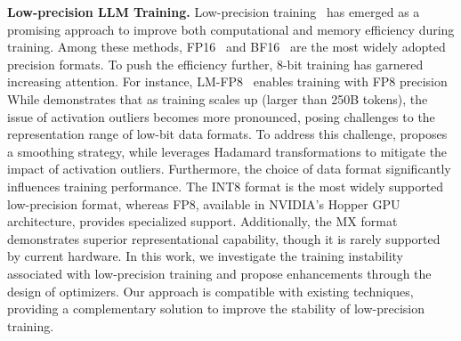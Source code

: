 \textbf{Low-precision LLM Training.} Low-precision training~\cite{wang2018training,lin2022device,xi2024coat,xi2024jetfire,wortsman2023stable} has emerged as a promising approach to improve both computational and memory efficiency during training. Among these methods, FP16~\cite{micikevicius2017mixed} and BF16~\cite{kalamkar2019study} are the most widely adopted precision formats. To push the efficiency further, 8-bit training has garnered increasing attention. For instance, LM-FP8~\cite{peng2023fp8} enables training with FP8 precision While \cite{fishman2024scaling} demonstrates that as training scales up (larger than 250B tokens), the issue of activation outliers becomes more pronounced, posing challenges to the representation range of low-bit data formats. To address this challenge, \cite{fishman2024scaling} proposes a smoothing strategy, while \cite{ashkboos2025halo} leverages Hadamard transformations to mitigate the impact of activation outliers. Furthermore, the choice of data format significantly influences training performance. The INT8 format is the most widely supported low-precision format, whereas FP8, available in NVIDIA’s Hopper GPU architecture, provides specialized support. Additionally, the MX format~\cite{rouhani2023microscaling} demonstrates superior representational capability, though it is rarely supported by current hardware. In this work, we investigate the training instability associated with low-precision training and propose enhancements through the design of optimizers. Our approach is compatible with existing techniques, providing a complementary solution to improve the stability of low-precision training.